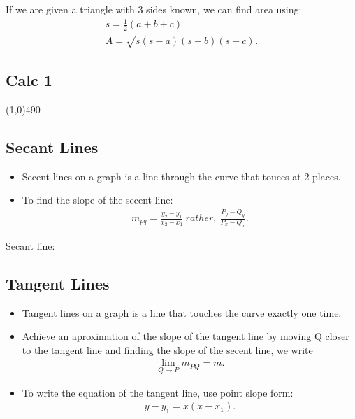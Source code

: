 \documentclass{report}
\begin{document}
  \bigbreak \noindent \bigbreak \noindent
  If we are given a triangle with 3 sides known, we can find area using:
  \begin{align*}
    s = \frac{1}{2}(a+b+c) \\
    A = \sqrt{s(s-a)(s-b)(s-c)}
  .\end{align*}




    \pagebreak \bigbreak \noindent
    \begin{center}
      \section{\Large{Calc 1}}
    \end{center}
    \line(1,0){490}
    \bigbreak \noindent \bigbreak \noindent 
    \subsection{Secant Lines}
    \begin{itemize}
      \item Secent lines on a graph is a line through the curve that touces at 2 places.
      \item To find the slope of the secent line:
        \begin{align*}
          m_{pq} = \frac{y_{2}-y_{1}}{x_{2}-x_{1}}\ rather,\ \frac{P_{y} - Q_{y}}{P_{x}-Q_{x}}
        .\end{align*}
    \end{itemize}
    \bigbreak \noindent 
    Secant line:
    \begin{figure}[ht]
        \centering
        \label{fig:secline}
    \end{figure}

    \bigbreak \noindent \bigbreak \noindent
    \subsection{Tangent Lines}
    \begin{itemize}
      \item Tangent lines on a graph is a line that touches the curve exactly one time.
      \item Achieve an aproximation of the slope of the tangent line by moving Q closer to the tangent line and finding the slope of the secent line, we write
        \begin{align*}
          \lim\limits_{Q \to P}{m_{PQ} = m}
        .\end{align*}
      \item To write the equation of the tangent line, use point slope form:
        \begin{align*}
          y- y_{1} = x(x-x_{1})
        .\end{align*}
    \end{itemize}
\end{document}
